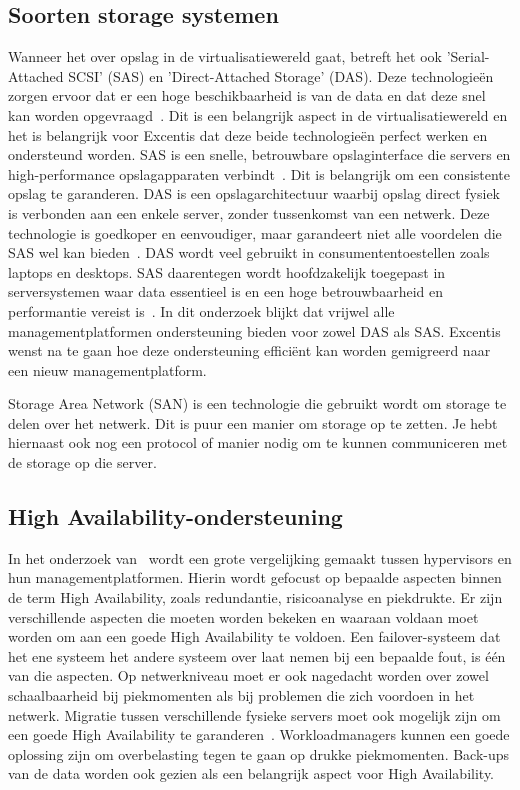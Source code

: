\subsection{Soorten storage systemen}\label{subsec:storage}
Wanneer het over opslag in de virtualisatiewereld gaat, betreft het ook 'Serial-Attached SCSI' (SAS) en 'Direct-Attached Storage' (DAS). Deze technologieën zorgen ervoor dat er een hoge beschikbaarheid is van de data en dat deze snel kan worden opgevraagd~\autocite{griswold2002storage}. Dit is een belangrijk aspect in de virtualisatiewereld en het is belangrijk voor Excentis dat deze beide technologieën perfect werken en ondersteund worden.
SAS is een snelle, betrouwbare opslaginterface die servers en high-performance opslagapparaten verbindt~\autocite{aravindan2014performance}. Dit is belangrijk om een consistente opslag te garanderen. DAS is een opslagarchitectuur waarbij opslag direct fysiek is verbonden aan een enkele server, zonder tussenkomst van een netwerk. Deze technologie is goedkoper en eenvoudiger, maar garandeert niet alle voordelen die SAS wel kan bieden~\autocite{griswold2002storage}.
DAS wordt veel gebruikt in consumententoestellen zoals laptops en desktops. SAS daarentegen wordt hoofdzakelijk toegepast in serversystemen waar data essentieel is en een hoge betrouwbaarheid en performantie vereist is~\autocite{griswold2002storage}.
In dit onderzoek blijkt dat vrijwel alle managementplatformen ondersteuning bieden voor zowel DAS als SAS. Excentis wenst na te gaan hoe deze ondersteuning efficiënt kan worden gemigreerd naar een nieuw managementplatform.

Storage Area Network (SAN) \textcite{ibm2025san} is een technologie die gebruikt wordt om storage te delen over het netwerk.
Dit is puur een manier om storage op te zetten.
Je hebt hiernaast ook nog een protocol of manier nodig om te kunnen communiceren met de storage op die server.


\subsection{High Availability-ondersteuning}\label{subsec:ha}
In het onderzoek van~\textcite{dudnik2017creating} wordt een grote vergelijking gemaakt tussen hypervisors en hun managementplatformen. Hierin wordt gefocust op bepaalde aspecten binnen de term High Availability, zoals redundantie, risicoanalyse en piekdrukte.
Er zijn verschillende aspecten die moeten worden bekeken en waaraan voldaan moet worden om aan een goede High Availability te voldoen. Een failover-systeem dat het ene systeem het andere systeem over laat nemen bij een bepaalde fout, is één van die aspecten.
Op netwerkniveau moet er ook nagedacht worden over zowel schaalbaarheid bij piekmomenten als bij problemen die zich voordoen in het netwerk. Migratie tussen verschillende fysieke servers moet ook mogelijk zijn om een goede High Availability te garanderen~\autocite{dudnik2017creating}.
Workloadmanagers kunnen een goede oplossing zijn om overbelasting tegen te gaan op drukke piekmomenten. Back-ups van de data worden ook gezien als een belangrijk aspect voor High Availability.



